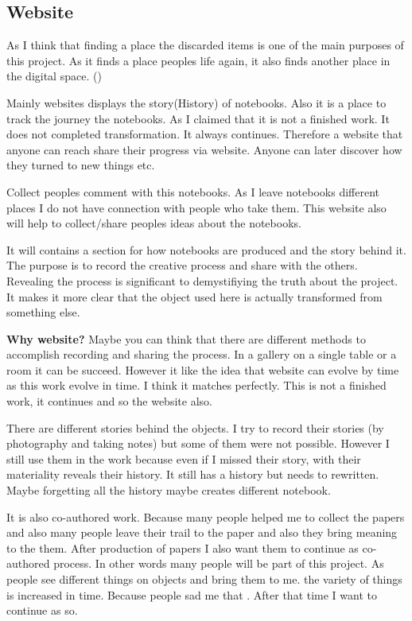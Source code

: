\subsection{Website}
As I think that finding a place the discarded items is one of the main purposes of this project. As it finds a place peoples life again, it also finds another place in the digital space. ()

Mainly websites displays the story(History) of notebooks. Also it is a place to track the journey the notebooks. As I claimed that it is not a finished work. It does not completed transformation. It always continues. Therefore a website that anyone can reach share their progress via website. Anyone can later discover how they turned to new things etc. 

Collect peoples comment with this notebooks. As I leave notebooks different places I do not have connection with people who take them. This website also will help to collect/share peoples ideas about the notebooks.

It will contains a section for how notebooks are produced and the story behind it. The purpose is to record the creative process and share with the others. Revealing the process is significant to demystifiying the truth about the project. It makes it more clear that the object used here is actually transformed from something else. 

\textbf{Why website?} Maybe you can think that there are different methods to accomplish recording and sharing the process. In a gallery on a single table or a room it can be succeed. However it like the idea that website can evolve by time as this work evolve in time. I think it matches perfectly. This is not a finished work, it continues and so the website also. 

There are different stories behind the objects. I try to record their stories (by photography and taking notes) but some of them were not possible. However I still use them in the work because even if I missed their story, with their materiality reveals their history. It still has a history but needs to rewritten. Maybe forgetting all the history maybe creates different notebook.

It is also co-authored work. Because many people helped me to collect the papers and also many people leave their trail to the paper and also they bring meaning to the them. After production of papers I also want them to continue as co-authored process. In other words many people will be part of this project. As people see different things on objects and bring them to me. the variety of things is increased in time. Because people sad me that . After that time I want to continue as so. 

